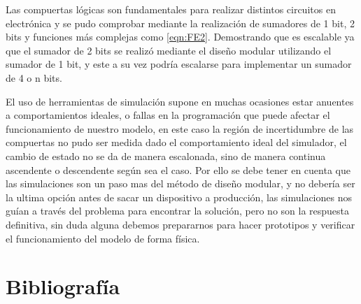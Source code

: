 \documentclass[journal]{IEEEtran}
\begin{document}
	Las compuertas lógicas son fundamentales para realizar distintos circuitos en electrónica y se pudo comprobar mediante la realización de sumadores de 1 bit, 2 bits y funciones más complejas como \ref{eqn:FE2}. Demostrando que es escalable ya que el sumador de 2 bits se realizó mediante el diseño modular utilizando el sumador de 1 bit, y este a su vez podría escalarse para implementar un sumador de 4 o n bits.
	
	El uso de herramientas de simulación supone en muchas ocasiones estar anuentes a comportamientos ideales, o fallas en la programación que puede afectar el funcionamiento de nuestro modelo, en este caso la región de incertidumbre de las compuertas no pudo ser medida dado el comportamiento ideal del simulador, el cambio de estado no se da de manera escalonada, sino de manera continua ascendente o descendente según sea el caso. Por ello se debe tener en cuenta que las simulaciones son un paso mas del método de diseño modular, y no debería ser la ultima opción antes de sacar un dispositivo a producción, las simulaciones nos guían a través del problema para encontrar la solución, pero no son la respuesta definitiva, sin duda alguna debemos prepararnos para hacer prototipos y verificar el funcionamiento del modelo de forma física. 
	
	\section{Bibliografía}
	
\end{document}
